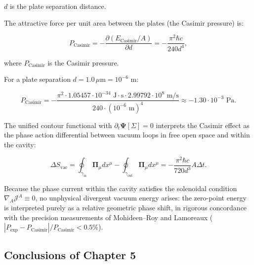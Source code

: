$d$ is the plate separation distance.

The attractive force per unit area between the plates (the Casimir pressure) is:

\begin{equation}\label{eq:5.69}\tag{5.69}
P_{\text{Casimir}} = - \frac{\partial (E_{\text{Casimir}}/A)}{\partial d} = - \frac{\pi^2 \hbar c}{240 d^4},
\end{equation}

where $P_{\text{Casimir}}$ is the Casimir pressure.

For a plate separation $d = 1.0\,\mu\text{m} = 10^{-6}\text{ m}$:

\begin{equation}\label{eq:5.70}\tag{5.70}
P_{\text{Casimir}} = - \frac{\pi^2 \cdot 1.05457 \cdot 10^{-34}\text{ J}\cdot\text{s} \cdot 2.99792 \cdot 10^8\text{ m/s}}{240 \cdot (10^{-6}\text{ m})^4} \approx - 1.30 \cdot 10^{-3}\text{ Pa}.
\end{equation}

The unified contour functional with $\partial_t \mathbf{\Psi}[\Sigma] = 0$ interprets the Casimir effect as the phase action differential between vacuum loops in free open space and within the cavity:

\begin{equation}\label{eq:5.71}\tag{5.71}
\Delta S_{\text{vac}} = \oint_{\gamma_{\text{in}}} \mathbf{\Pi}_\mu dx^\mu - \oint_{\gamma_{\text{out}}} \mathbf{\Pi}_\mu dx^\mu = - \frac{\pi^2 \hbar c}{720 d^3} A \Delta t.
\end{equation}

Because the phase current within the cavity satisfies the solenoidal condition $\nabla_A \mathcal{J}^A \equiv 0$, no unphysical divergent vacuum energy arises: the zero-point energy is interpreted purely as a relative geometric phase shift, in rigorous concordance with the precision measurements of Mohideen--Roy and Lamoreaux ($|P_{\text{exp}} - P_{\text{Casimir}}| / P_{\text{Casimir}} < 0.5\%$).

\subsection{Conclusions of Chapter 5}\label{sec:5.5}

